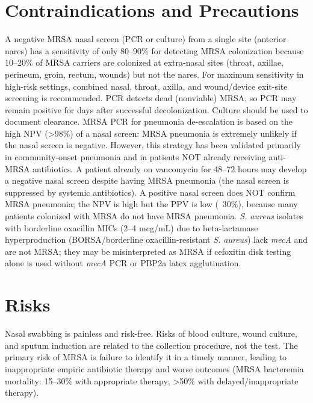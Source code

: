 \section*{Contraindications and Precautions}
A negative MRSA nasal screen (PCR or culture) from a single site (anterior nares) has a sensitivity of only 80--90\% for detecting MRSA colonization because 10--20\% of MRSA carriers are colonized at extra-nasal sites (throat, axillae, perineum, groin, rectum, wounds) but not the nares. For maximum sensitivity in high-risk settings, combined nasal, throat, axilla, and wound/device exit-site screening is recommended. PCR detects dead (nonviable) MRSA, so PCR may remain positive for days after successful decolonization. Culture should be used to document clearance. MRSA PCR for pneumonia de-escalation is based on the high NPV (>98\%) of a nasal screen: MRSA pneumonia is extremely unlikely if the nasal screen is negative. However, this strategy has been validated primarily in community-onset pneumonia and in patients NOT already receiving anti-MRSA antibiotics. A patient already on vancomycin for 48--72 hours may develop a negative nasal screen despite having MRSA pneumonia (the nasal screen is suppressed by systemic antibiotics). A positive nasal screen does NOT confirm MRSA pneumonia; the NPV is high but the PPV is low (~30\%), because many patients colonized with MRSA do not have MRSA pneumonia. \textit{S. aureus} isolates with borderline oxacillin MICs (2--4 mcg/mL) due to beta-lactamase hyperproduction (BORSA/borderline oxacillin-resistant \textit{S. aureus}) lack \textit{mecA} and are not MRSA; they may be misinterpreted as MRSA if cefoxitin disk testing alone is used without \textit{mecA} PCR or PBP2a latex agglutination.

\section*{Risks}
Nasal swabbing is painless and risk-free. Risks of blood culture, wound culture, and sputum induction are related to the collection procedure, not the test. The primary risk of MRSA is failure to identify it in a timely manner, leading to inappropriate empiric antibiotic therapy and worse outcomes (MRSA bacteremia mortality: 15--30\% with appropriate therapy; >50\% with delayed/inappropriate therapy).

